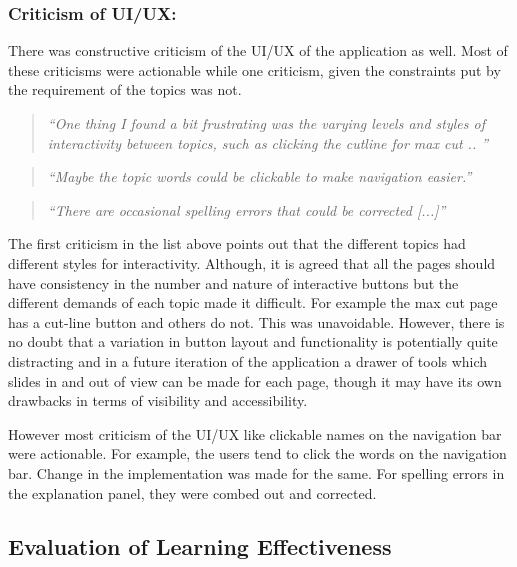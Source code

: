 \subsubsection{Criticism of UI/UX:}
There was constructive criticism of the UI/UX of the application as well.
Most of these criticisms were actionable while one criticism, given the
constraints put by the requirement of the topics was not.

\begin{quote}
\emph{``One thing I found a bit frustrating was the varying levels and styles of
interactivity between topics, such as clicking the cutline for max cut .. ''}
\end{quote}

\vspace{0.06 in}

\begin{quote}
\emph{``Maybe the topic words could be clickable to make navigation easier.''}
\end{quote}

\vspace{0.06 in}
\begin{quote}
\emph{``There are occasional spelling errors that
   could be corrected [...]'' }
\end{quote}

The first criticism in the list above points out that the different topics had
different styles for interactivity.  Although, it is agreed that all the pages
should have consistency in the number and nature of interactive buttons
but the different demands of each topic made it difficult. For example the max
cut page has a cut-line button and others do not. This was unavoidable.
However, there is no doubt that a variation in button layout and
functionality is potentially quite distracting and in a future iteration
of the application a drawer of tools which slides in and out of view can be made for
each page, though it may have its own drawbacks in terms of visibility and
accessibility.

However most criticism of the UI/UX like clickable names on the navigation bar
were actionable.  For example, the users tend to click the words on the
navigation bar. Change in the implementation was made for the same. For
spelling errors in the explanation panel, they were combed out and corrected.


\subsection{Evaluation of Learning Effectiveness}


